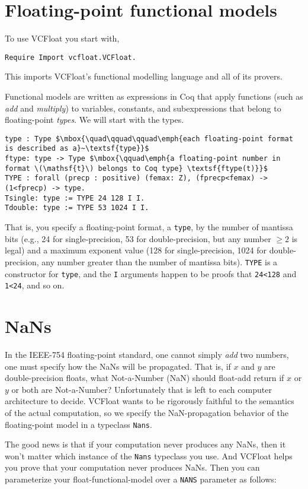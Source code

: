 \documentclass[article]{memoir}
\begin{document}
\chapter{Floating-point functional models}
To use VCFloat you start with,
\begin{lstlisting}
Require Import vcfloat.VCFloat.
\end{lstlisting}
This imports VCFloat's functional modelling language and all of its
provers.  

Functional models are written as expressions in Coq that apply
functions (such as \emph{add} and \emph{multiply}) to
variables, constants, and subexpressions that belong to floating-point
\emph{types}.  We will start with the types.

\begin{lstlisting}
type : Type $\mbox{\quad\qquad\qquad\emph{each floating-point format is described as a}~\textsf{type}}$
ftype: type -> Type $\mbox{\qquad\emph{a floating-point number in format \(\mathsf{t}\) belongs to Coq type} \textsf{ftype(t)}}$
TYPE : forall (precp : positive) (femax: Z), (fprecp<femax) -> (1<fprecp) -> type.
Tsingle: type := TYPE 24 128 I I.
Tdouble: type := TYPE 53 1024 I I.
\end{lstlisting}

That is, you specify a floating-point format, a \lstinline{type}, by
the number of mantissa bits (e.g., 24 for single-precision, 53 for
double-precision, but any number $\ge 2$ is legal) and a maximum
exponent value (128 for single-precision, 1024 for double-precision,
any number greater than the number of mantissa bits).
\lstinline{TYPE} is a constructor for \lstinline{type}, and the
\lstinline{I} arguments happen to be proofs that \lstinline{24<128}
and \lstinline{1<24}, and so on.

\chapter{NaNs}
In the IEEE-754 floating-point standard, one cannot
simply \emph{add} two numbers, one must specify how the NaNs will
be propagated.  That is, if $x$ and $y$ are double-precision floats,
what Not-a-Number (NaN) should float-add return if $x$ or $y$ or both are
Not-a-Number?  Unfortunately that is left to each computer architecture 
to decide.  VCFloat wants to be rigorously faithful to the
semantics of the actual computation, so we specify the
NaN-propagation behavior of the floating-point model in a
typeclass \lstinline{Nans}.

The good news is that if your computation never produces any
NaNs, then it won't matter which instance of the \lstinline{Nans}
typeclass you use.  And VCFloat helps you prove that your computation
never produces NaNs.
Then you can parameterize your float-functional-model
over a \lstinline{NANS} parameter
 as follows:
\end{document}

